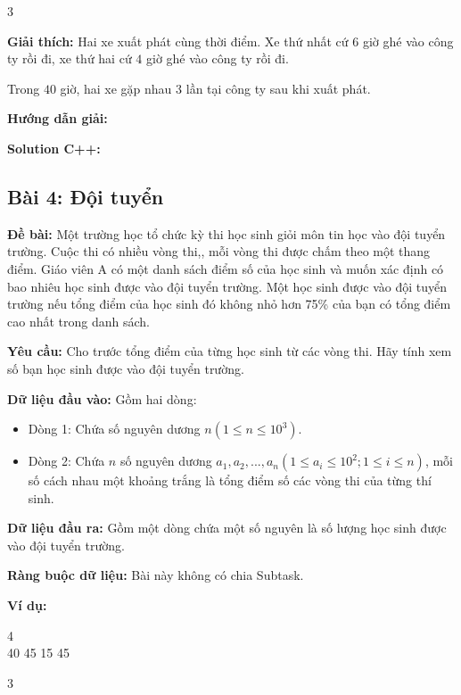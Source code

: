 \documentclass[12pt]{scrartcl}  %
\begin{document}
\begin{tcolorbox}[colback=gray!5!white, colframe=green!50!black, title=Output]
3
\end{tcolorbox}

\textbf{Giải thích:}
Hai xe xuất phát cùng thời điểm. Xe thứ nhất cứ $6$ giờ ghé vào công ty rồi đi, xe thứ hai cứ $4$ giờ ghé vào công ty rồi đi. 

Trong $40$ giờ, hai xe gặp nhau $3$ lần tại công ty sau khi xuất phát.

\textbf{Hướng dẫn giải:}

\textbf{Solution C++:}

\subsection{Bài 4: Đội tuyển}

\textbf{Đề bài:}
Một trường học tổ chức kỳ thi học sinh giỏi môn tin học vào đội tuyển trường. Cuộc thi có nhiều vòng thi,, mỗi vòng thi được chấm theo một thang điểm. Giáo viên A có một danh sách điểm số của học sinh và muốn xác định có bao nhiêu học sinh được vào đội tuyển trường. Một học sinh được vào đội tuyển trường nếu tổng điểm của học sinh đó không nhỏ hơn 75\% của bạn có tổng điểm cao nhất trong danh sách. 

\textbf{Yêu cầu:}
Cho trước tổng điểm của từng học sinh từ các vòng thi. Hãy tính xem số bạn học sinh được vào đội tuyển trường. 

\textbf{Dữ liệu đầu vào:}
Gồm hai dòng:
\begin{itemize}
    \item Dòng 1: Chứa số nguyên dương $n (1 \leq n \leq 10^3)$.
    \item Dòng 2: Chứa $n$ số nguyên dương $a_1, a_2, ... , a_n (1 \leq a_i \leq 10^2; 1 \leq i \leq n)$, mỗi số cách nhau một khoảng trắng là tổng điểm số các vòng thi của từng thí sinh.
\end{itemize}

\textbf{Dữ liệu đầu ra:}
Gồm một dòng chứa một số nguyên là số lượng học sinh được vào đội tuyển trường.

\textbf{Ràng buộc dữ liệu:}
Bài này không có chia Subtask.

\textbf{Ví dụ:}
\begin{tcolorbox}[colback=gray!5!white, colframe=blue!50!black, title=Input]
4\\
40 45 15 45
\end{tcolorbox}
\begin{tcolorbox}[colback=gray!5!white, colframe=green!50!black, title=Output]
3
\end{tcolorbox}
\end{document}
